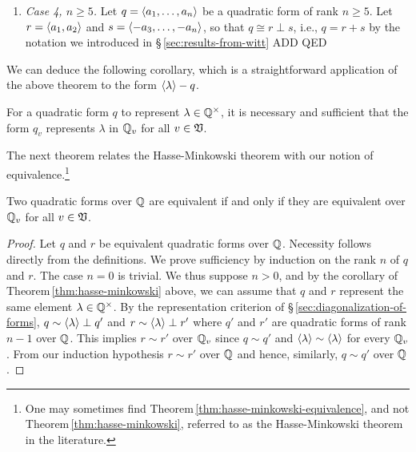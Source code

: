 \begin{enumerate}[wide, nosep, label=(\alph*)]
    \item \emph{Case 4, \(n \geq 5\).} Let \(q = \langle a_1, \dots, a_n \rangle\) be a quadratic form of rank \(n \geq 5\). Let \(r = \langle a_1, a_2 \rangle\) and \(s = \langle -a_3, \dots, -a_n \rangle\), so that \(q \cong r \perp s\), i.e., \(q = r + s\) by the notation we introduced in \S\,\ref{sec:results-from-witt} 
    ADD QED
\end{enumerate}

\medskip

We can deduce the following corollary, which is a straightforward application of the above theorem to the form \(\langle \lambda \rangle - q\).

\begin{corollary}
    For a quadratic form \(q\) to represent \(\lambda \in \mathbb{Q}^{\times}\), it is necessary and sufficient that the form \(q_v\) represents \(\lambda\) in \(\mathbb{Q}_v\) for all \(v \in \mathfrak{V}\).
\end{corollary}

The next theorem relates the Hasse-Minkowski theorem with our notion of equivalence.\footnote{One may sometimes find Theorem\,\ref{thm:hasse-minkowski-equivalence}, and not Theorem\,\ref{thm:hasse-minkowski}, referred to as the Hasse-Minkowski theorem in the literature.}

\begin{theoremx}\label{thm:hasse-minkowski-equivalence}
    Two quadratic forms over \(\mathbb{Q}\) are equivalent if and only if they are equivalent over \(\mathbb{Q}_v\) for all \(v \in \mathfrak{V}\).
\end{theoremx}

\begin{proof}
    Let \(q\) and \(r\) be equivalent quadratic forms over \(\mathbb{Q}\). Necessity follows directly from the definitions. We prove sufficiency by induction on the rank \(n\) of \(q\) and \(r\). The case \(n = 0\) is trivial. We thus suppose \(n > 0\), and by the corollary of Theorem\,\ref{thm:hasse-minkowski} above, we can assume that \(q\) and \(r\) represent the same element \(\lambda \in \mathbb{Q}^{\times}\). By the representation criterion of \S\,\ref{sec:diagonalization-of-forms}, \(q \sim \langle \lambda \rangle \perp q'\) and \(r \sim \langle \lambda \rangle \perp r'\) where \(q'\) and \(r'\) are quadratic forms of rank \(n - 1\) over \(\mathbb{Q}\). This implies \(r \sim r'\) over \(\mathbb{Q}_v\) since \(q \sim q'\) and \(\langle \lambda \rangle \sim \langle \lambda \rangle\) for every \(\mathbb{Q}_v\). From our induction hypothesis \(r \sim r'\) over \(\mathbb{Q}\) and hence, similarly, \(q \sim q'\) over \(\mathbb{Q}\).
\end{proof}

